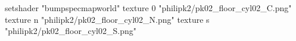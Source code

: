 setshader "bumpspecmapworld"
    texture 0 "philipk2/pk02_floor_cyl02_C.png"
    texture n "philipk2/pk02_floor_cyl02_N.png"
    texture s "philipk2/pk02_floor_cyl02_S.png"